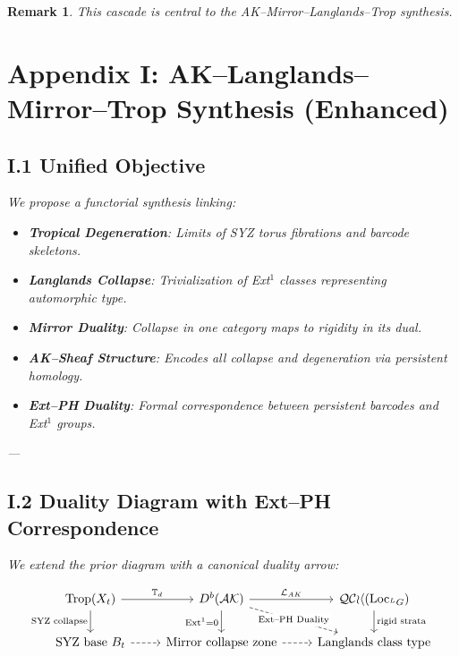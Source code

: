\documentclass[11pt]{article}
\newtheorem{remark}[theorem]{Remark}
\begin{document}
\begin{remark}
This cascade is central to the AK–Mirror–Langlands–Trop synthesis.



\section*{Appendix I: AK–Langlands–Mirror–Trop Synthesis (Enhanced)}

\subsection*{I.1 Unified Objective}

We propose a functorial synthesis linking:

\begin{itemize}
  \item \textbf{Tropical Degeneration}: Limits of SYZ torus fibrations and barcode skeletons.
  \item \textbf{Langlands Collapse}: Trivialization of Ext$^1$ classes representing automorphic type.
  \item \textbf{Mirror Duality}: Collapse in one category maps to rigidity in its dual.
  \item \textbf{AK–Sheaf Structure}: Encodes all collapse and degeneration via persistent homology.
  \item \textbf{Ext–PH Duality}: Formal correspondence between persistent barcodes and Ext${}^1$ groups.
\end{itemize}

---

\subsection*{I.2 Duality Diagram with Ext–PH Correspondence}

We extend the prior diagram with a canonical duality arrow:

\[
\begin{tikzcd}
\mathrm{Trop}(X_t) \arrow[r, "\mathbb{T}_d"] \arrow[d, "\text{SYZ collapse}"'] &
D^b(\mathcal{AK}) \arrow[r, "\mathcal{L}_{AK}"] \arrow[d, "\mathrm{Ext}^1 = 0"'] \arrow[dr, dashed, "\text{Ext--PH Duality}" description] &
\mathcal{QCoh}(\mathrm{Loc}_{^LG}) \arrow[d, "\text{rigid strata}"] \\
\text{SYZ base } B_t \arrow[r, dashed] &
\text{Mirror collapse zone} \arrow[r, dashed] &
\text{Langlands class type}
\end{tikzcd}
\]


\end{remark}
\end{document}
